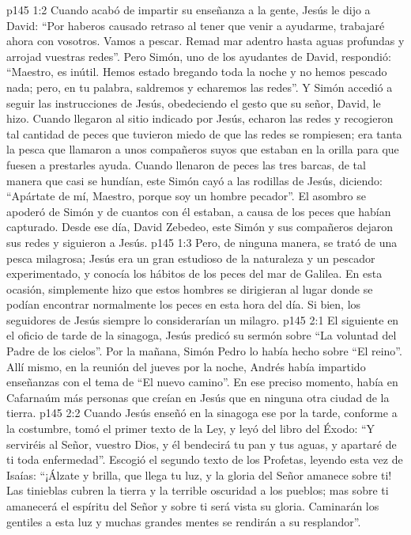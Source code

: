 \vs p145 1:2 Cuando acabó de impartir su enseñanza a la gente, Jesús le dijo a David: “Por haberos causado retraso al tener que venir a ayudarme, trabajaré ahora con vosotros. Vamos a pescar. Remad mar adentro hasta aguas profundas y arrojad vuestras redes”. Pero Simón, uno de los ayudantes de David, respondió: “Maestro, es inútil. Hemos estado bregando toda la noche y no hemos pescado nada; pero, en tu palabra, saldremos y echaremos las redes”. Y Simón accedió a seguir las instrucciones de Jesús, obedeciendo el gesto que su señor, David, le hizo. Cuando llegaron al sitio indicado por Jesús, echaron las redes y recogieron tal cantidad de peces que tuvieron miedo de que las redes se rompiesen; era tanta la pesca que llamaron a unos compañeros suyos que estaban en la orilla para que fuesen a prestarles ayuda. Cuando llenaron de peces las tres barcas, de tal manera que casi se hundían, este Simón cayó a las rodillas de Jesús, diciendo: “Apártate de mí, Maestro, porque soy un hombre pecador”. El asombro se apoderó de Simón y de cuantos con él estaban, a causa de los peces que habían capturado. Desde ese día, David Zebedeo, este Simón y sus compañeros dejaron sus redes y siguieron a Jesús.
\vs p145 1:3 Pero, de ninguna manera, se trató de una pesca milagrosa; Jesús era un gran estudioso de la naturaleza y un pescador experimentado, y conocía los hábitos de los peces del mar de Galilea. En esta ocasión, simplemente hizo que estos hombres se dirigieran al lugar donde se podían encontrar normalmente los peces en esta hora del día. Si bien, los seguidores de Jesús siempre lo considerarían un milagro.
\vs p145 2:1 El siguiente  en el oficio de tarde de la sinagoga, Jesús predicó su sermón sobre “La voluntad del Padre de los cielos”. Por la mañana, Simón Pedro lo había hecho sobre “El reino”. Allí mismo, en la reunión del jueves por la noche, Andrés había impartido enseñanzas con el tema de “El nuevo camino”. En ese preciso momento, había en Cafarnaúm más personas que creían en Jesús que en ninguna otra ciudad de la tierra.
\vs p145 2:2 Cuando Jesús enseñó en la sinagoga ese  por la tarde, conforme a la costumbre, tomó el primer texto de la Ley, y leyó del libro del Éxodo: “Y serviréis al Señor, vuestro Dios, y él bendecirá tu pan y tus aguas, y apartaré de ti toda enfermedad”. Escogió el segundo texto de los Profetas, leyendo esta vez de Isaías: “¡Álzate y brilla, que llega tu luz, y la gloria del Señor amanece sobre ti! Las tinieblas cubren la tierra y la terrible oscuridad a los pueblos; mas sobre ti amanecerá el espíritu del Señor y sobre ti será vista su gloria. Caminarán los gentiles a esta luz y muchas grandes mentes se rendirán a su resplandor”.
